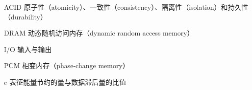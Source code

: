 \begin{denotation}
\item[ACID] 原子性（atomicity）、一致性（consistency）、隔离性（isolation）和持久性（durability）
\item[DRAM] 动态随机访问内存（dynamic random access memory）
\item[I/O] 输入与输出
\item[PCM] 相变内存（phase-change memory）
\item[$e$] 表征能量节约的量与数据滞后量的比值
\end{denotation}
